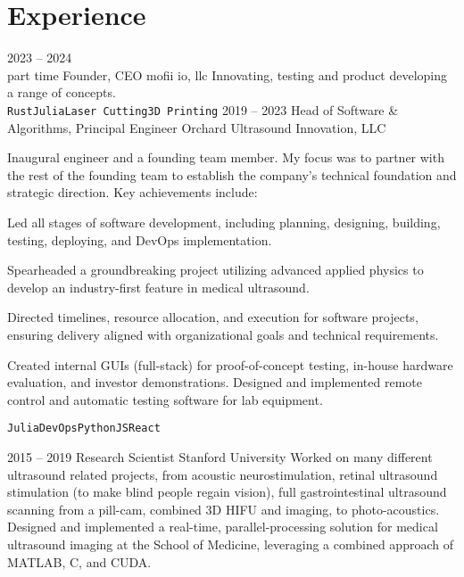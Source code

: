 \documentclass[8pt]{mofiicv}
\begin{document}
\begin{minipage}[T]{\SecondColumnWidth} 
\section{Experience}
\begin{entrylist}
	\entry
		{2023 -- 2024\\\footnotesize{part time}}
		{Founder, CEO}
		{mofii io, llc}
		{
		Innovating, testing and product developing a range of concepts.\\ 
		\texttt{Rust}\slashsep\texttt{Julia}\slashsep\texttt{Laser Cutting}\slashsep\texttt{3D Printing}
		}
	\entry
		{2019 -- 2023}
		{Head of Software \& Algorithms, Principal Engineer}
		{Orchard Ultrasound Innovation, LLC}
		{
		Inaugural engineer and a founding team member. My focus was to partner with the rest of the founding team to establish the company’s technical foundation and strategic direction. Key achievements include:
		\begin{description}[noitemsep,font=\normalfont\itshape]
			\item[Software Development Leadership] Led all stages of software development, including planning, designing, building, testing, deploying, and DevOps implementation.
			\item[Nonlinear Signal Processing] Spearheaded a groundbreaking project utilizing advanced applied physics to develop an industry-first feature in medical ultrasound. 
			\item[Strategic Project Management]  Directed timelines, resource allocation, and execution for software projects, ensuring delivery aligned with organizational goals and technical requirements.
			\item[Innovative Software Solutions] Created internal GUIs (full-stack) for proof-of-concept testing, in-house hardware evaluation, and investor demonstrations. Designed and implemented remote control and automatic testing software for lab equipment.
		\end{description}
		\texttt{Julia}\slashsep\texttt{DevOps}\slashsep\texttt{Python}\slashsep\texttt{JS}\slashsep\texttt{React}
		}
	\entry
		{2015 -- 2019}
		{Research Scientist}
		{Stanford University}
		{
		Worked on many different ultrasound related projects, from acoustic neurostimulation, retinal ultrasound stimulation (to make blind people regain vision), full gastrointestinal ultrasound scanning from a pill-cam, combined 3D HIFU and imaging, to photo-acoustics. Designed and implemented a real-time, parallel-processing solution for medical ultrasound imaging at the School of Medicine, leveraging a combined approach of MATLAB, C, and CUDA.
}
\end{entrylist}
\end{minipage}
\end{document}
